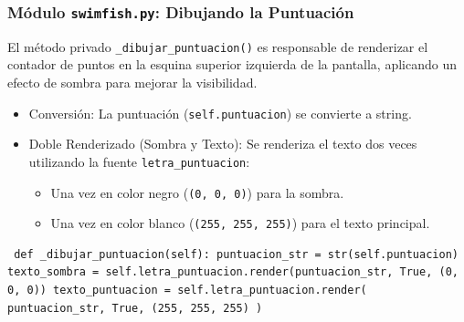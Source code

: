\documentclass[
	11pt, %
]{beamer}
\begin{document}

\begin{frame}[fragile] \frametitle{Módulo \texttt{swimfish.py}: Dibujando la Puntuación}

El método privado \texttt{_dibujar_puntuacion()} es responsable de renderizar el contador de puntos en la esquina superior izquierda de la pantalla, aplicando un efecto de sombra para mejorar la visibilidad.

\begin{itemize} \item Conversión: La puntuación (\texttt{self.puntuacion}) se convierte a string. \item Doble Renderizado (Sombra y Texto): Se renderiza el texto dos veces utilizando la fuente \texttt{letra_puntuacion}: \begin{itemize} \item Una vez en color negro (\texttt{(0, 0, 0)}) para la sombra. \item Una vez en color blanco (\texttt{(255, 255, 255)}) para el texto principal. \end{itemize} \end{itemize}

\vspace{4pt} {\scriptsize \begin{verbatim} def _dibujar_puntuacion(self): puntuacion_str = str(self.puntuacion) texto_sombra = self.letra_puntuacion.render(puntuacion_str, True, (0, 0, 0)) texto_puntuacion = self.letra_puntuacion.render( puntuacion_str, True, (255, 255, 255) ) \end{verbatim} } \end{frame}

\end{document}
